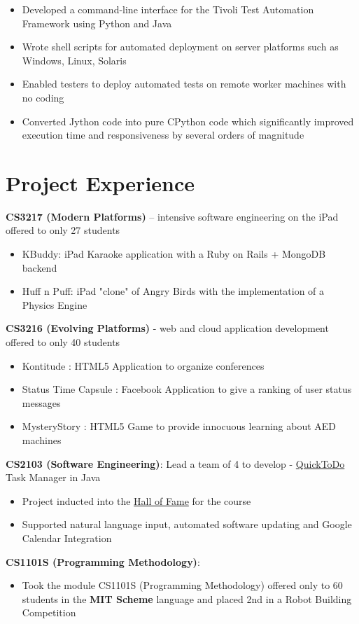 \documentclass[11pt,a4paper]{moderncv}
\begin{document}
{\begin{itemize}
        \item Developed a command-line interface for the Tivoli Test Automation Framework using Python and Java
        \item Wrote shell scripts for automated deployment on server platforms such as Windows, Linux, Solaris
        \item Enabled testers to deploy automated tests on remote worker machines with no coding
        \item Converted Jython code into pure CPython code which significantly improved execution time and responsiveness by several orders of magnitude
 \end{itemize}}
\section{Project Experience}
\textbf{CS3217 (Modern Platforms)} – intensive software engineering on the iPad offered to only 27 students
 \begin{itemize}
     \item KBuddy: iPad Karaoke application with a Ruby on Rails + MongoDB backend
     \item Huff n Puff: iPad "clone" of Angry Birds with the implementation of a Physics Engine
 \end{itemize}
 \textbf{CS3216 (Evolving Platforms)} - web and cloud application development offered to only 40 students
   \begin{itemize}
     \item Kontitude : HTML5 Application to organize conferences
     \item Status Time Capsule : Facebook Application to give a ranking of user status messages
     \item MysteryStory : HTML5 Game to provide innocuous learning about AED machines
   \end{itemize}
\newpage{} \textbf{CS2103 (Software Engineering)}: Lead a team of 4 to develop - \href{http://github.com/vellvisher/quicktodo}{QuickToDo} Task Manager in Java
 \begin{itemize}
     \item Project inducted into the \href{http://www.comp.nus.edu.sg/~cs2103/AY1112S1projects/halloffame.html}{Hall of Fame}
         for the course
    \item Supported natural language input, automated software updating and Google Calendar Integration
 \end{itemize}
 \textbf{CS1101S (Programming Methodology)}:
 \begin{itemize}
    \item Took the module CS1101S (Programming Methodology) offered only
        to 60 students in the \textbf{MIT Scheme} language and placed 2nd in a Robot Building Competition
 \end{itemize}
\end{document}
